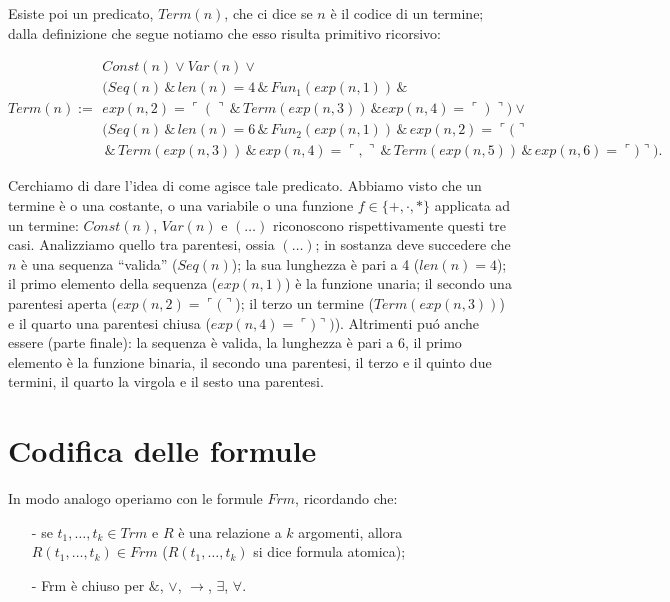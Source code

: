 Esiste poi un predicato, $Term(n)$, che ci dice se $n$ \`e il codice di un termine; dalla definizione che segue notiamo che esso risulta primitivo ricorsivo:

\small{
\begin{displaymath}
 Term(n) := \left. \begin{array}{l}  Const(n) \vee Var(n) \vee\\
(Seq(n) \, \& \, len(n) = 4 \,\& \, Fun_1(exp(n,1)) \,\& \\
exp(n,2) = \ulcorner ( \urcorner \,\&\, Term(exp(n,3)) \,\&
exp(n,4) = \ulcorner ) \urcorner) \vee \\
(Seq(n) \, \& \, len (n)=6 \, \& \, Fun_2(exp(n,1)) \,\&\, exp(n,2)= \ulcorner ( \urcorner  \\
\,\&\,Term(exp(n,3)) \,\&\, exp(n,4) = \ulcorner , \urcorner \,\&\,Term(exp(n,5)) \,\&\, exp(n,6) = \ulcorner ) \urcorner
).
\end{array} \right.
\end{displaymath}
}

Cerchiamo di dare l'idea di come agisce tale predicato. Abbiamo visto che un termine \`e o una costante, o una variabile o una funzione $f\in \{+, \cdot, *\}$ applicata ad un termine: $Const(n)$, $Var(n)$ e $(\dots)$ riconoscono rispettivamente questi tre casi. Analizziamo quello tra parentesi, ossia $(\dots)$; in sostanza  deve succedere che
$n$ \`e una sequenza ``valida'' ($Seq(n)$); la sua lunghezza \`e pari a 4 ($len(n)=4$); il primo elemento della sequenza ($exp(n,1)$) \`e la funzione unaria; il secondo una parentesi aperta ($exp(n,2) = \ulcorner ( \urcorner$); il terzo un termine ($Term(exp(n,3))$) e il quarto una parentesi chiusa ($exp(n,4) = \ulcorner ) \urcorner)$).
Altrimenti pu\'o anche essere (parte finale): la sequenza \`e valida, la lunghezza \`e pari a 6, il primo elemento \`e la funzione binaria, il secondo una parentesi, il terzo e il quinto due termini, il quarto la virgola e il sesto una parentesi.
 

\section{Codifica delle formule}

In modo analogo operiamo con le formule $Frm$, ricordando che:
\begin{itemize}
\item[-]{se $t_1,\dots, t_k \in Trm$ e $R$ \`e una relazione a $k$ argomenti, allora $R(t_1,\dots, t_k) \in Frm$ ($R(t_1,\dots, t_k)$ si dice formula atomica)};
\item[-]{Frm \`e chiuso per $\&$, $\vee$, $\rightarrow$, $\exists$, $\forall$}.
\end{itemize}

